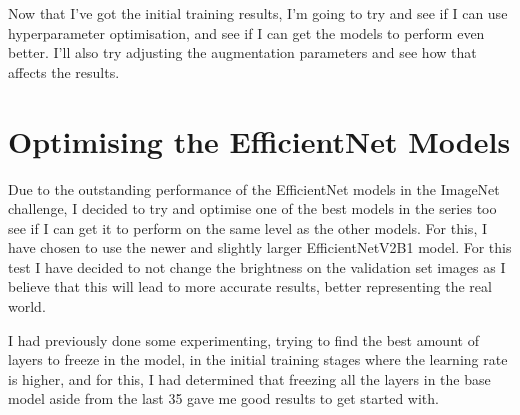 \documentclass[]{final_report}
\begin{document}
Now that I've got the initial training results, I'm going to try and see if I can use hyperparameter optimisation, and see if I can get the models to perform even better. I'll also try adjusting the augmentation parameters and see how that affects the results.


\section{Optimising the EfficientNet Models}

Due to the outstanding performance of the EfficientNet models in the ImageNet challenge, I decided to try and optimise one of the best models in the series too see if I can get it to perform on the same level as the other models. For this, I have chosen to use the newer and slightly larger EfficientNetV2B1 model. For this test I have decided to not change the brightness on the validation set images as I believe that this will lead to more accurate results, better representing the real world.

I had previously done some experimenting, trying to find the best amount of layers to freeze in the model, in the initial training stages where the learning rate is higher, and for this, I had determined that freezing all the layers in the base model aside from the last 35 gave me good results to get started with.

\end{document}
